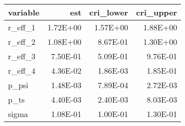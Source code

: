 \begin{table}[ht]
\centering
\begin{tabular}{lrrr}
  \hline
variable & est & cri\_lower & cri\_upper \\ 
  \hline
r\_eff\_1 & 1.72E+00 & 1.57E+00 & 1.88E+00 \\ 
  r\_eff\_2 & 1.08E+00 & 8.67E-01 & 1.30E+00 \\ 
  r\_eff\_3 & 7.50E-01 & 5.09E-01 & 9.76E-01 \\ 
  r\_eff\_4 & 4.36E-02 & 1.86E-03 & 1.85E-01 \\ 
  p\_psi & 1.48E-03 & 7.89E-04 & 2.72E-03 \\ 
  p\_ts & 4.40E-03 & 2.40E-03 & 8.03E-03 \\ 
  sigma & 1.08E-01 & 1.00E-01 & 1.30E-01 \\ 
   \hline
\end{tabular}
\end{table}
